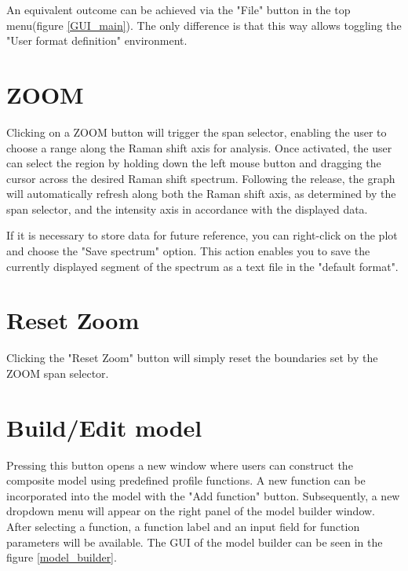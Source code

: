 An equivalent outcome can be achieved via the "File" button in the top menu(figure \ref{GUI_main}). The only difference is that this way allows toggling the "User format definition" environment.

\section{ZOOM}
Clicking on a ZOOM button will trigger the span selector, enabling the user to choose a range along the Raman shift axis for analysis. Once activated, the user can select the region by holding down the left mouse button and dragging the cursor across the desired Raman shift spectrum. Following the release, the graph will automatically refresh along both the Raman shift axis, as determined by the span selector, and the intensity axis in accordance with the displayed data.
\par
If it is necessary to store data for future reference, you can right-click on the plot and choose the "Save spectrum" option. This action enables you to save the currently displayed segment of the spectrum as a text file in the "default format".
\section{Reset Zoom}
Clicking the "Reset Zoom" button will simply reset the boundaries set by the ZOOM span selector.
\section{Build/Edit model}
\label{model_building}
Pressing this button opens a new window where users can construct the composite model using predefined profile functions. A new function can be incorporated into the model with the "Add function" button. Subsequently, a new dropdown menu will appear on the right panel of the model builder window. After selecting a function, a function label and an input field for function parameters will be available. The GUI of the model builder can be seen in the figure \ref{model_builder}.

